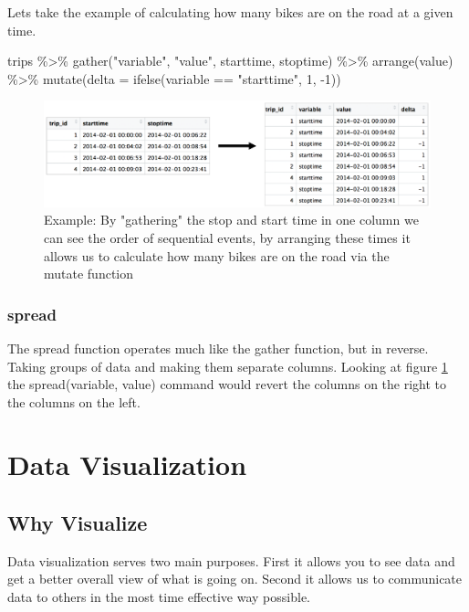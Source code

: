 \documentclass{article}
\begin{document}
\begin{flushleft}
Lets take the example of calculating how many bikes are on the road at a given time.
\end{flushleft}

\begin{center}
trips \%\textgreater\% gather("variable", "value", starttime, stoptime) \%\textgreater\% arrange(value) \%\textgreater\% mutate(delta = ifelse(variable == "starttime", 1, -1))
\end{center}    

\begin{figure}[H]
    \centering
    \includegraphics[width=.75\textwidth]{gather_ex.png}
    \caption{Example: By "gathering" the stop and start time in one column we can see the order of sequential events, by arranging these times it allows us to calculate how many bikes are on the road via the mutate function}
    \label{fig:gather_ex}
\end{figure}


\subsubsection{spread}
\begin{flushleft}
The spread function operates much like the gather function, but in reverse. Taking groups of data and making them separate columns. Looking at figure \ref{fig:gather_ex} the spread(variable, value) command would revert the columns on the right to the columns on the left.
\end{flushleft}


\section{Data Visualization}
\subsection{Why Visualize}

\begin{flushleft}
Data visualization serves two main purposes. First it allows you to see data and get a better overall view of what is going on. Second it allows us to communicate data to others in the most time effective way possible. 
\end{flushleft}
\end{document}
